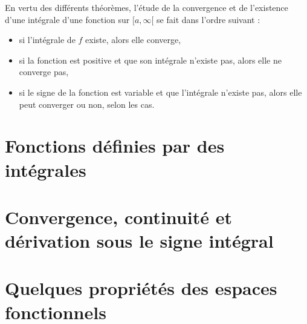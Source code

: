 En vertu des différents théorèmes, l'étude de la convergence et de l'existence d'une intégrale d'une fonction sur $[a,\infty[$ se fait dans l'ordre suivant :
\begin{itemize}
\item si l'intégrale de $f$ existe, alors elle converge,
\item si la fonction est positive et que son intégrale n'existe pas, alors elle ne converge pas,
\item si le signe de la fonction est variable et que l'intégrale n'existe pas, alors elle peut converger ou non, selon les cas.
\end{itemize}

	
					\section{Fonctions définies par des intégrales}



					\section{Convergence, continuité et dérivation sous le signe intégral}

					\section{Quelques propriétés des espaces fonctionnels}


